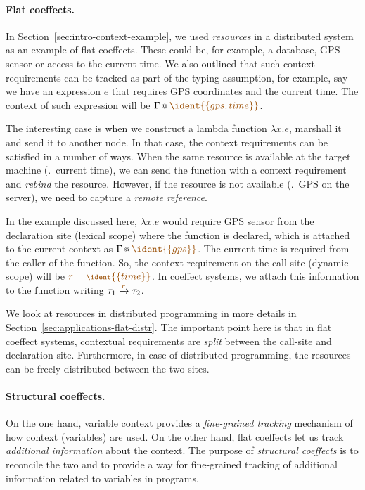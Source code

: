 \paragraph{Flat coeffects.}

In Section~\ref{sec:intro-context-example}, we used \emph{resources} in a distributed system as an 
example of flat coeffects. These could be, for example, a database, GPS sensor or access to the current 
time. We also outlined that such context requirements can be tracked as part of the typing assumption,
for example, say we have an expression $e$ that requires GPS coordinates and the current time. 
The context of such expression will be $\coctx{\Gamma}{ \aclrd{\ident{\{ gps, time \}}} }$.

The interesting case is when we construct a lambda function $\lambda x.e$, marshall it and
send it to another node. In that case, the context requirements can be satisfied in a number of
ways. When the same resource is available at the target machine (\eg.~current time), we can
send the function with a context requirement and \emph{rebind} the resource. However, if the
resource is not available (\eg.~GPS on the server), we need to capture a \emph{remote reference}.

In the example discussed here, $\lambda x.e$ would require GPS sensor from the declaration
site (lexical scope) where the function is declared, which is attached to the current context
as $\coctx{\Gamma}{ \aclrd{\ident{\{ gps \}}} }$. The current time is required from the caller
of the function. So, the context requirement on the call site (dynamic scope) will be
$\aclrd{r}=\aclrd{\footnotesize\ident{\{ time \}}}$. In coeffect systems, we attach this information
to the function writing $\tau_1 \xrightarrow{ \aclrd{r} } \tau_2$.

We look at resources in distributed programming in more details in Section~\ref{sec:applications-flat-distr}.
The important point here is that in flat coeffect systems, contextual requirements are 
\emph{split} between the call-site and declaration-site. Furthermore, in case of distributed
programming, the resources can be freely distributed between the two sites.

\paragraph{Structural coeffects.}

On the one hand, variable context provides a \emph{fine-grained tracking} mechanism of how context
(variables) are used. On the other hand, flat coeffects let us track \emph{additional information} about 
the context. The purpose of \emph{structural coeffects} is to reconcile the two and to provide a way
for fine-grained tracking of additional information related to variables in programs.

